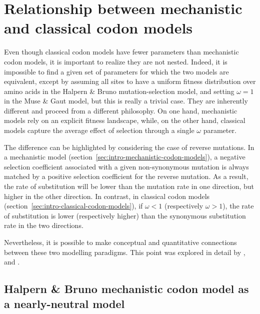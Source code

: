 \section{Relationship between mechanistic and classical codon models}
\label{sec:relationship-between-mechanistic-and-classical-codon-models}

Even though classical codon models have fewer parameters than mechanistic codon models, it is important to realize they are not nested.
Indeed, it is impossible to find a given set of parameters for which the two models are equivalent, except by assuming all sites to have a uniform fitness distribution over amino acids in the Halpern \& Bruno mutation-selection model, and setting $\omega = 1$ in the Muse \& Gaut model, but this is really a trivial case.
They are inherently different and proceed from a different philosophy.
On one hand, mechanistic models rely on an explicit fitness landscape, while, on the other hand, classical models capture the average effect of selection through a single $\omega$ parameter.

The difference can be highlighted by considering the case of reverse mutations.
In a mechanistic model (section~\ref{sec:intro-mechanistic-codon-models}), a negative selection coefficient associated with a given non-synonymous mutation is always matched by a positive selection coefficient for the reverse mutation.
As a result, the rate of substitution will be lower than the mutation rate in one direction, but higher in the other direction.
In contrast, in classical codon models (section~\ref{sec:intro-classical-codon-models}), if $\omega < 1$ (respectively $\omega> 1$), the rate of substitution is lower (respectively higher) than the synonymous substitution rate in the two directions.

Nevertheless, it is possible to make conceptual and quantitative connections between these two modelling paradigms.
This point was explored in detail by \citet{Spielman2015}, \citet{DosReis2015} and \citet{Jones2016}.

\subsection{Halpern \& Bruno mechanistic codon model as a nearly-neutral model}
\label{subsec:HB-formalism-nearly-neutral-model}

